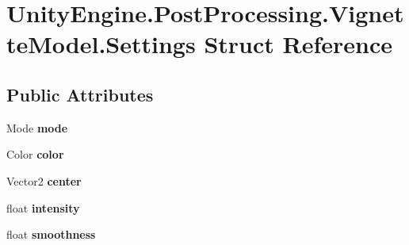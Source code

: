 \hypertarget{struct_unity_engine_1_1_post_processing_1_1_vignette_model_1_1_settings}{}\section{Unity\+Engine.\+Post\+Processing.\+Vignette\+Model.\+Settings Struct Reference}
\label{struct_unity_engine_1_1_post_processing_1_1_vignette_model_1_1_settings}
\subsection*{Public Attributes}
\begin{DoxyCompactItemize}
\item 
\mbox{\label{struct_unity_engine_1_1_post_processing_1_1_vignette_model_1_1_settings_a70993fbc5ddef9c6c693ab24e3bcdb7f}} 
Mode {\bfseries mode}
\item 
\mbox{\label{struct_unity_engine_1_1_post_processing_1_1_vignette_model_1_1_settings_a005772424eda7fa18a7fb0680d5502b4}} 
Color {\bfseries color}
\item 
\mbox{\label{struct_unity_engine_1_1_post_processing_1_1_vignette_model_1_1_settings_abe48f553acd7a93dbd24c142ebf5848c}} 
Vector2 {\bfseries center}
\item 
\mbox{\label{struct_unity_engine_1_1_post_processing_1_1_vignette_model_1_1_settings_a1c9bfe2cdd2bbf056335af7c889f5cd8}} 
float {\bfseries intensity}
\item 
\mbox{\label{struct_unity_engine_1_1_post_processing_1_1_vignette_model_1_1_settings_a8414a693bb78e1e9ccf559b1fb44d566}} 
float {\bfseries smoothness}
\item 
\mbox{\label{struct_unity_engine_1_1_post_processing_1_1_vignette_model_1_1_settings_aa177ec69f0450f879da7f02cceb3b43d}} 

\end{DoxyCompactItemize}
